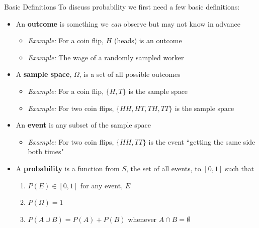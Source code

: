 \documentclass[aspectratio=169,11pt]{beamer}
\begin{document}
\begin{frame}{Basic Definitions}
To discuss probability we first need a few basic definitions:
\begin{itemize}
	\item An {\bf outcome} is something we \emph{can} observe but may not know in advance
	\begin{itemize}
		\item[] \emph{Example:} For a coin flip, $H$ (heads) is an outcome
		\item[] \emph{Example:} The wage of a randomly sampled worker
	\end{itemize}	
	\item A {\bf sample space}, $\Omega$, is a set of all possible outcomes
		\begin{itemize}
		\item[] \emph{Example:} For a coin flip, $\{H,T\}$ is the sample space
		\item[] \emph{Example:} For two coin flips, $\{HH,HT,TH,TT\}$ is the sample space
	\end{itemize}
	\item An {\bf event} is any subset of the sample space
		\begin{itemize}
			\item[] \emph{Example:} For two coin flips, $\{HH,TT\}$ is the event ``getting the same side both times"
		\end{itemize}
		
	\item A {\bf probability} is a function from $S$, the set of all events, to $[0,1]$ such that
	{\small \begin{enumerate}
			\item $P(E)\in[0,1]$ for any event, $E$
			\item $P(\Omega)=1$
			\item $P(A\cup B) = P(A)+P(B)$ whenever $A\cap B = \emptyset$
		\end{enumerate}}

\end{itemize}
\end{frame}
\end{document}
